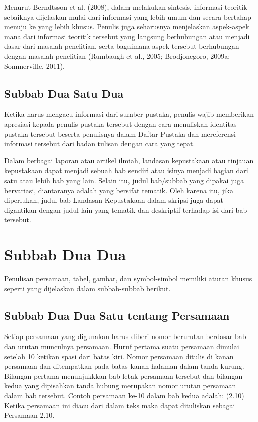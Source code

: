 Menurut Berndtsson et al. (2008), dalam melakukan sintesis, informasi teoritik sebaiknya dijelaskan mulai dari informasi yang lebih umum dan secara bertahap menuju ke yang lebih khusus. Penulis juga seharusnya menjelaskan aspek-aspek mana dari informasi teoritik tersebut yang langsung berhubungan atau menjadi dasar dari masalah penelitian, serta bagaimana aspek tersebut berhubungan dengan masalah penelitian (Rumbaugh et al., 2005; Brodjonegoro, 2009a; Sommerville, 2011).

\subsection{Subbab Dua Satu Dua}

Ketika harus mengacu informasi dari sumber pustaka, penulis wajib memberikan apresiasi kepada penulis pustaka tersebut dengan cara menuliskan identitas pustaka tersebut beserta penulisnya dalam Daftar Pustaka dan mereferensi informasi tersebut dari badan tulisan dengan cara yang tepat.

Dalam berbagai laporan atau artikel ilmiah, landasan kepustakaan atau tinjauan kepustakaan dapat menjadi sebuah bab sendiri atau isinya menjadi bagian dari satu atau lebih bab yang lain. Selain itu, judul bab/subbab yang dipakai juga bervariasi, diantaranya adalah yang bersifat tematik. Oleh karena itu, jika diperlukan, judul bab Landasan Kepustakaan dalam skripsi juga dapat digantikan dengan judul lain yang tematik dan deskriptif terhadap isi dari bab tersebut.

\section{Subbab Dua Dua}

Penulisan persamaan, tabel, gambar, dan symbol-simbol memiliki aturan khusus seperti yang dijelaskan dalam subbab-subbab berikut.

\subsection{Subbab Dua Dua Satu tentang Persamaan}

Setiap   persamaan   yang   digunakan   harus   diberi   nomor   berurutan  berdasar bab dan urutan munculnya persamaan. Huruf pertama suatu persamaan dimulai setelah 10 ketikan spasi dari batas kiri. Nomor persamaan ditulis di kanan persamaan dan ditempatkan pada batas kanan halaman dalam tanda kurung. Bilangan pertama menunjukkkan bab letak persamaan tersebut dan bilangan kedua yang dipisahkan tanda hubung merupakan nomor urutan persamaan dalam bab tersebut. Contoh persamaan ke-10 dalam bab kedua adalah:
           							(2.10)
Ketika persamaan ini diacu dari dalam teks maka dapat dituliskan sebagai Persamaan 2.10. 

